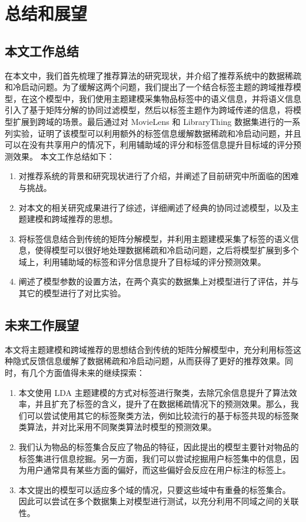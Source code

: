 \chapter{总结和展望}

\section{本文工作总结}
在本文中，我们首先梳理了推荐算法的研究现状，并介绍了推荐系统中的数据稀疏和冷启动问题。为了缓解这两个问题，我们提出了一个结合标签主题的跨域推荐模型，在这个模型中，我们使用主题建模采集物品标签中的语义信息，并将语义信息引入了基于矩阵分解的协同过滤模型，然后以标签主题作为跨域传递的信息，将模型扩展到跨域的场景。最后通过对 MovieLens 和 LibraryThing 数据集进行的一系列实验，证明了该模型可以利用额外的标签信息缓解数据稀疏和冷启动问题，并且可以在没有共享用户的情况下，利用辅助域的评分和标签信息提升目标域的评分预测效果。
本文工作总结如下：
\begin{enumerate}
\item 对推荐系统的背景和研究现状进行了介绍，并阐述了目前研究中所面临的困难与挑战。
\item 对本文的相关研究成果进行了综述，详细阐述了经典的协同过滤模型，以及主题建模和跨域推荐的思想。
\item 将标签信息结合到传统的矩阵分解模型，并利用主题建模采集了标签的语义信息，使得模型可以很好地处理数据稀疏和冷启动问题，之后将模型扩展到多个域上，利用辅助域的标签和评分信息提升了目标域的评分预测效果。
\item 阐述了模型参数的设置方法，在两个真实的数据集上对模型进行了评估，并与其它的模型进行了对比实验。
\end{enumerate}

\section{未来工作展望}
本文将主题建模和跨域推荐的思想结合到传统的矩阵分解模型中，充分利用标签这种隐式反馈信息缓解了数据稀疏和冷启动问题，从而获得了更好的推荐效果。同时，有几个方面值得未来的继续探索：
\begin{enumerate}
\item 本文使用 LDA 主题建模的方式对标签进行聚类，去除冗余信息提升了算法效率，并且扩充了标签的含义，提升了在数据稀疏情况下的预测效果。那么，我们可以尝试使用其它的标签聚类方法，例如比较流行的基于标签共现的标签聚类算法\cite{王娅丹2015标签共现的标签聚类算法研究}，并对比采用不同聚类算法时模型的预测效果。
\item 我们认为物品的标签集合反应了物品的特征，因此提出的模型主要针对物品的标签集进行信息挖掘。另一方面，我们可以尝试挖掘用户标签集中的信息，因为用户通常具有某些方面的偏好，而这些偏好会反应在用户标注的标签上。
\item 本文提出的模型可以适应多个域的情况，只要这些域中有重叠的标签集合。
因此可以尝试在多个数据集上对模型进行测试，以充分利用不同域之间的关联性。
\end{enumerate}

